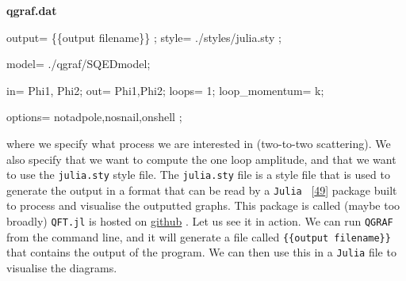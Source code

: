 \documentclass[
  10pt,
  a4paper,
  DIV=11,
  numbers=noendperiod,
  twoside]{scrreprt}
\newenvironment{Shaded}{\begin{snugshade}}{\end{snugshade}}
\newcommand{\NormalTok}[1]{\textcolor[rgb]{0.00,0.23,0.31}{#1}}
\DeclareRobustCommand{\[}{\begin{equation}}
\DeclareRobustCommand{\]}{\end{equation}}
\begin{document}
\textbf{qgraf.dat}

\begin{Shaded}
\begin{Highlighting}[]
\NormalTok{output= \textquotesingle{}\{\{output filename\}\}\textquotesingle{} ;}
\NormalTok{style= \textquotesingle{}./styles/julia.sty\textquotesingle{} ; }

\NormalTok{model= \textquotesingle{}./qgraf/SQEDmodel\textquotesingle{};}

\NormalTok{in= Phi1,  Phi2;}
\NormalTok{out= Phi1,Phi2;}
\NormalTok{loops= 1;}
\NormalTok{loop\_momentum= k;}

\NormalTok{options=  notadpole,nosnail,onshell ;}
\end{Highlighting}
\end{Shaded}

where we specify what process we are interested in (two-to-two
scattering). We also specify that we want to compute the one loop
amplitude, and that we want to use the \texttt{julia.sty} style file.
The \texttt{julia.sty} file is a style file that is used to generate the
output in a format that can be read by a \texttt{Julia}
~{[}\protect\hyperlink{ref-Bezanson:2015}{49}{]} package built to
process and visualise the outputted graphs. This package is called
(maybe too broadly) \texttt{QFT.jl} is hosted on
\href{https://github.com/lcnhb/QFT.jl}{github} . Let us see it in
action. We can run \texttt{QGRAF} from the command line, and it will
generate a file called \texttt{\{\{output\ filename\}\}} that contains
the output of the program. We can then use this in a \texttt{Julia} file
to visualise the diagrams.
\end{document}
